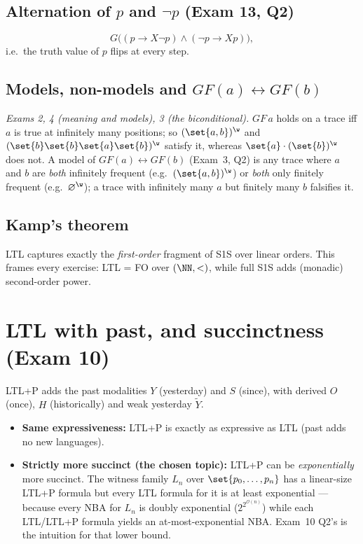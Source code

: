 \documentclass[oneside]{academica}
\begin{document}
\subsection{Alternation of \texorpdfstring{$p$}{p} and \texorpdfstring{$\neg p$}{not p} (Exam 13, Q2)}
\[
  G\big((p\rightarrow X\neg p)\wedge(\neg p\rightarrow X p)\big),
\]
i.e.\ the truth value of $p$ flips at every step.

\subsection{Models, non-models and \texorpdfstring{$GF(a)\leftrightarrow GF(b)$}{GF(a)<->GF(b)}}
\emph{Exams 2, 4 (meaning and models), 3 (the biconditional).}
$GF\,a$ holds on a trace iff $a$ is true at infinitely many positions; so
$(\set{a,b})^{\w}$ and $(\set{b}\set{b}\set{a}\set{b})^{\w}$ satisfy it,
whereas $\set{a}\cdot(\set{b})^{\w}$ does not. A model of
$GF(a)\leftrightarrow GF(b)$ (Exam~3, Q2) is any trace where $a$ and $b$
are \emph{both} infinitely frequent (e.g.\ $(\set{a,b})^{\w}$) or
\emph{both} only finitely frequent (e.g.\ $\emptyset^{\w}$); a trace with
infinitely many $a$ but finitely many $b$ falsifies it.

\subsection{Kamp's theorem}
LTL captures exactly the \emph{first-order} fragment of S1S over linear
orders. This frames every  exercise:
LTL = FO over $(\NN,<)$, while full S1S adds (monadic) second-order
power.

\section{LTL with past, and succinctness (Exam 10)}
LTL+P adds the past modalities $Y$ (yesterday) and $S$ (since), with
derived $O$ (once), $H$ (historically) and weak yesterday $\widetilde{Y}$.

\begin{itemize}
  \item \textbf{Same expressiveness:} LTL+P is exactly as expressive as
    LTL (past adds no new languages).
  \item \textbf{Strictly more succinct (the chosen topic):} LTL+P can be
    \emph{exponentially} more succinct. The witness family $L_n$ over
    $\set{p_0,\dots,p_n}$ has a linear-size LTL+P formula but every LTL
    formula for it is at least exponential --- because every NBA for
    $L_n$ is doubly exponential ($2^{2^{\mathcal{O}(n)}}$) while each LTL/LTL+P
    formula yields an at-most-exponential NBA. Exam~10 Q2's
     is the intuition for that lower bound.
\end{itemize}
\end{document}
